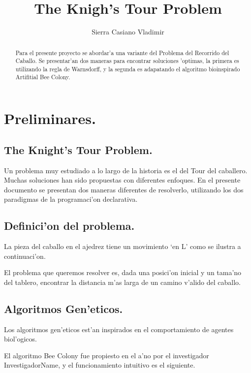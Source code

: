 \documentclass[12pt]{article}
\title{The Knigh's Tour Problem}
\author{Sierra Casiano Vladimir}
\begin{document}
    \maketitle

    \begin{abstract}
        Para el presente proyecto se abordar'a una variante del Problema del Recorrido del
        Caballo.
        Se presentar'an dos maneras para encontrar soluciones
        'optimas, la primera es utilizando la regla de Warnsdorff, y la segunda
        es adapatando el algoritmo bioinspirado Artifitial Bee Colony.
    \end{abstract}



    


    \section{Preliminares.}

    \subsection{The Knight's Tour Problem.}


    Un problema muy estudiado a lo largo de la historia es el del Tour del caballero.
    Muchas soluciones han sido propuestas con diferentes enfoques. En el presente
    documento se presentan dos maneras diferentes de resolverlo, utilizando los dos paradigmas de
    la programaci'on declarativa.

    \subsection{Definici'on del problema.}
    La pieza del caballo en el ajedrez tiene un movimiento `en L' \; como
    se ilustra a continuaci'on.

    El problema que queremos resolver es, dada una posici'on inicial y un tama'no del tablero,
    encontrar la distancia m'as larga de un camino v'alido del caballo.

    \subsection{Algoritmos Gen'eticos.}
    Los algoritmos gen'eticos est'an inspirados en el comportamiento de
    agentes biol'ogicos.

    El algoritmo Bee Colony fue propiesto en el a'no por el investigador InvestigadorName,
    y el funcionamiento intuitivo es el siguiente.
\end{document}
